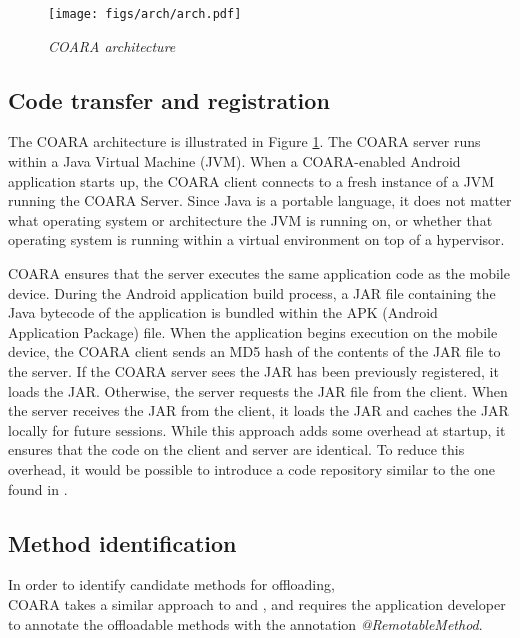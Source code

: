 \documentclass[10pt,journal,cspaper,compsoc]{IEEEtran}
\begin{document}
\begin{figure}
\centering
\texttt{[image: figs/arch/arch.pdf]}
\caption{\small\textsl{COARA architecture}}
\label{fig:arch}
\end{figure}


\subsection{Code transfer and registration \label{section.code_transfer}}


The COARA architecture is illustrated in Figure \ref{fig:arch}. The COARA server runs within a Java Virtual Machine (JVM).  When a COARA-enabled Android application starts up, the COARA client connects to a fresh instance of a JVM running the COARA Server.  Since Java is a portable language, it does not matter what operating system or architecture the JVM is running on, or whether that operating system is running within a virtual environment on top of a hypervisor.

COARA ensures that the server executes the same application code as the mobile device.  During the Android application build process, a JAR file containing the Java bytecode of the application is bundled within the APK (Android Application Package) file.
When the application begins execution on the mobile device, the COARA client sends an MD5 hash of the contents of the JAR file to the server.  If the COARA server sees the JAR has been previously registered, it loads the JAR.  Otherwise, the server requests the JAR file from the client.  When the server receives the JAR from the client, it loads the JAR  and caches the JAR locally for future sessions.  While this approach adds some overhead at startup, it ensures that the code on the client and server are identical.  To reduce this overhead, it would be possible to introduce a code repository similar to the one found in \cite{Cuervo:2010:MMS:1814433.1814441}.

\subsection{Method identification \label{section.method_idenification}}




In order to identify candidate methods for offloading, \\COARA takes a similar approach to \cite{Cuervo:2010:MMS:1814433.1814441} and \cite{Kosta:2012vx}, and requires the application developer to annotate the offloadable methods with the annotation \emph{@RemotableMethod}.
\end{document}
